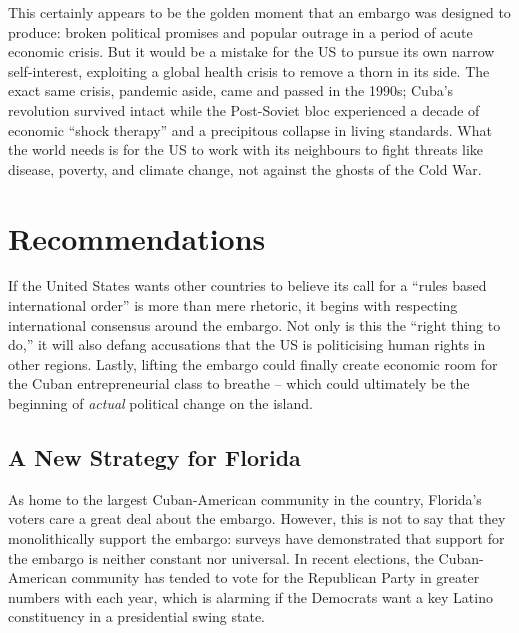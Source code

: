 \documentclass[letterpaper,12pt,twoside]{article} %
\begin{document}
\begin{multicols}{2}
This certainly appears to be the golden moment that an embargo was designed to produce: broken political promises and popular outrage in a period of acute economic crisis. But it would be a mistake for the US to pursue its own narrow self-interest, exploiting a global health crisis to remove a thorn in its side. The exact same crisis, pandemic aside, came and passed in the 1990s; Cuba's revolution survived intact while the Post-Soviet bloc experienced a decade of economic ``shock therapy'' and a precipitous collapse in living standards. What the world needs is for the US to work with its neighbours to fight threats like disease, poverty, and climate change, not against the ghosts of the Cold War.

\vfill
\pagebreak
\section{Recommendations}

If the United States wants other countries to believe its call for a ``rules based international order'' is more than mere rhetoric, it begins with respecting international consensus around the embargo. Not only is this the ``right thing to do,'' it will also defang accusations that the US is politicising human rights in other regions. Lastly, lifting the embargo could finally create economic room for the Cuban entrepreneurial class to breathe -- which could ultimately be the beginning of \textit{actual} political change on the island.

\subsection*{A New Strategy for Florida}

As home to the largest Cuban-American community in the country, Florida's voters care a great deal about the embargo. However, this is not to say that they monolithically support the embargo: surveys have demonstrated that support for the embargo is neither constant\autocite{symbolic2010girard} nor universal.\autocite{grenier20182018} In recent elections, the Cuban-American community has tended to vote for the Republican Party in greater numbers with each year\autocite{krogstad_2021}, which is alarming if the Democrats want a key Latino constituency in a presidential swing state.


\end{multicols}
\end{document}
